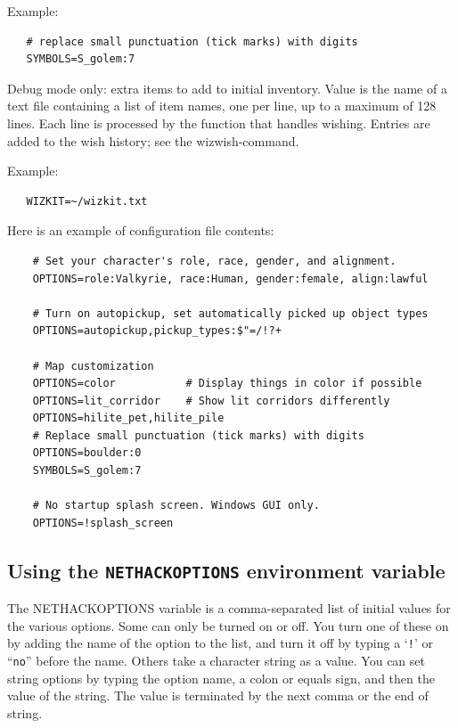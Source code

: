 \documentclass[titlepage]{article}
\begin{document}
\begin{description}
Example:
\begin{verbatim}
   # replace small punctuation (tick marks) with digits
   SYMBOLS=S_golem:7
\end{verbatim}

\item[WIZKIT]
Debug mode only:  extra items to add to initial inventory.
Value is the name of a text file containing a list of item names,
one per line, up to a maximum of 128 lines.
Each line is processed by the function that handles wishing.
Entries are added to the wish history; see the wizwish-command.

Example:
\begin{verbatim}
   WIZKIT=~/wizkit.txt
\end{verbatim}
\end{description}

Here is an example of configuration file contents:
\begin{verbatim}
    # Set your character's role, race, gender, and alignment.
    OPTIONS=role:Valkyrie, race:Human, gender:female, align:lawful

    # Turn on autopickup, set automatically picked up object types
    OPTIONS=autopickup,pickup_types:$"=/!?+

    # Map customization
    OPTIONS=color           # Display things in color if possible
    OPTIONS=lit_corridor    # Show lit corridors differently
    OPTIONS=hilite_pet,hilite_pile
    # Replace small punctuation (tick marks) with digits
    OPTIONS=boulder:0
    SYMBOLS=S_golem:7

    # No startup splash screen. Windows GUI only.
    OPTIONS=!splash_screen
\end{verbatim}

\subsection*{Using the \texttt{NETHACKOPTIONS} environment variable}

The NETHACKOPTIONS variable is a comma-separated list of initial
values for the various options.  Some can only be turned on or off.
You turn one of these on by adding the name of the option to the list,
and turn it off by typing a `\texttt{!}' or ``\texttt{no}'' before the name.
Others take a
character string as a value.  You can set string options by typing
the option name, a colon or equals sign, and then the value of the string.
The value is terminated by the next comma or the end of string.
\end{document}
